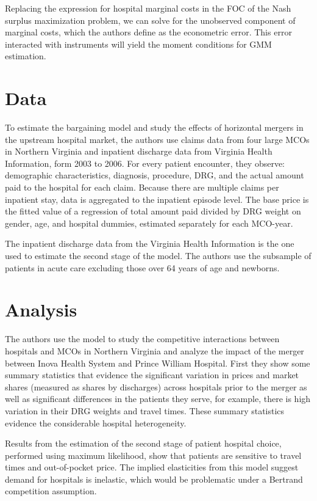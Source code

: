 \documentclass[12pt,english]{article}
\begin{document}
Replacing the expression for hospital marginal costs in the FOC of the Nash surplus maximization problem, we can solve for the unobserved component of marginal costs, which the authors define as the econometric error. This error interacted with instruments will yield the moment conditions for GMM estimation.

\section{Data}

To estimate the bargaining model and study the effects of horizontal mergers in the upstream hospital market, the authors use claims data from four large MCOs in Northern Virginia and inpatient discharge data from Virginia Health Information, form 2003 to 2006. For every patient encounter, they observe: demographic characteristics, diagnosis, procedure, DRG, and the actual amount paid to the hospital for each claim. Because there are multiple claims per inpatient stay, data is aggregated to the inpatient episode level. The base price is the fitted value of a regression of total amount paid divided by DRG weight on gender, age, and hospital dummies, estimated separately for each MCO-year.

The inpatient discharge data from the Virginia Health Information is the one used to estimate the second stage of the model. The authors use the subsample of patients in acute care excluding those over 64 years of age and newborns.

\section{Analysis}

The authors use the model to study the competitive interactions between hospitals and MCOs in Northern Virginia and analyze the impact of the merger between Inova Health System and Prince William Hospital. First they show some summary statistics that evidence the significant variation in prices and market shares (measured as shares by discharges) across hospitals prior to the merger as well as significant differences in the patients they serve, for example, there is high variation in their DRG weights and travel times. These summary statistics evidence the considerable hospital heterogeneity.

Results from the estimation of the second stage of patient hospital choice, performed using maximum likelihood, show that patients are sensitive to travel times and out-of-pocket price. The implied elasticities from this model suggest demand for hospitals is inelastic, which would be problematic under a Bertrand competition assumption.
\end{document}
